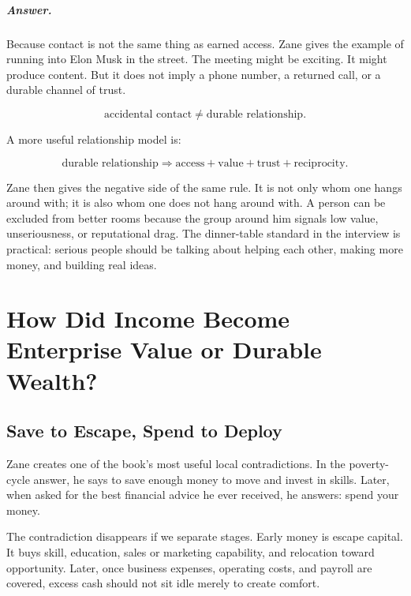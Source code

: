 \documentclass[11pt,oneside]{book}
\begin{document}
\paragraph{Answer.}
Because contact is not the same thing as earned access. Zane gives the example of running into Elon Musk in the street. The meeting might be exciting. It might produce content. But it does not imply a phone number, a returned call, or a durable channel of trust.

\begin{equation}
\text{accidental contact}\neq \text{durable relationship}.
\end{equation}

A more useful relationship model is:

\begin{equation}
\text{durable relationship}
\Rightarrow
\text{access}+\text{value}+\text{trust}+\text{reciprocity}.
\end{equation}

Zane then gives the negative side of the same rule. It is not only whom one hangs around with; it is also whom one does not hang around with. A person can be excluded from better rooms because the group around him signals low value, unseriousness, or reputational drag. The dinner-table standard in the interview is practical: serious people should be talking about helping each other, making more money, and building real ideas.

\chapter{How Did Income Become Enterprise Value or Durable Wealth?}

\section{Save to Escape, Spend to Deploy}

Zane creates one of the book's most useful local contradictions. In the poverty-cycle answer, he says to save enough money to move and invest in skills. Later, when asked for the best financial advice he ever received, he answers: spend your money.

The contradiction disappears if we separate stages. Early money is escape capital. It buys skill, education, sales or marketing capability, and relocation toward opportunity. Later, once business expenses, operating costs, and payroll are covered, excess cash should not sit idle merely to create comfort.
\end{document}
